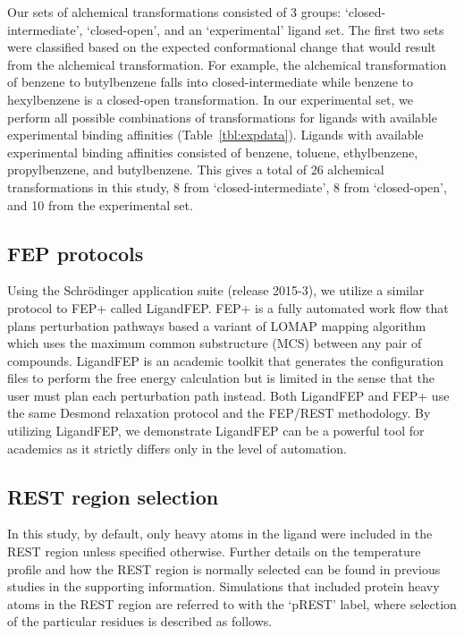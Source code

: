 \documentclass[journal=jctcce,manuscript=article]{achemso}
\begin{document}
Our sets of alchemical transformations consisted of 3 groups: `closed-intermediate', `closed-open', and an `experimental' ligand set.
The first two sets were classified based on the expected conformational change that would result from the alchemical transformation.
For example, the alchemical transformation of benzene to butylbenzene falls into closed-intermediate while benzene to hexylbenzene is a closed-open transformation.
In our experimental set, we perform all possible combinations of transformations for ligands with available experimental binding affinities (Table~\ref{tbl:expdata}).
Ligands with available experimental binding affinities consisted of benzene, toluene, ethylbenzene, propylbenzene, and butylbenzene.
This gives a total of 26 alchemical transformations in this study, 8 from `closed-intermediate', 8 from `closed-open', and 10 from the experimental set.
 
\subsection*{FEP protocols}
Using the Schr\"{o}dinger application suite (release 2015-3)\cite{Maestro-Desmond}, we utilize a similar protocol to FEP+\cite{FEPplus} called LigandFEP\cite{LigandFEP}.
FEP+ is a fully automated work flow that plans perturbation pathways based a variant of LOMAP\cite{LOMAP} mapping algorithm which uses the maximum common substructure (MCS) between any pair of compounds.
LigandFEP is an academic toolkit that generates the configuration files to perform the free energy calculation but is limited in the sense that the user must plan each perturbation path instead.
Both LigandFEP and FEP+ use the same Desmond relaxation protocol and the FEP/REST methodology\cite{REST,REST2,FEP/REST,FEP/RESTapp}. 
By utilizing LigandFEP, we demonstrate LigandFEP can be a powerful tool for academics as it strictly differs only in the level of automation.

\subsection*{REST region selection}
In this study, by default, only heavy atoms in the ligand were included in the REST region unless specified otherwise.
Further details on the temperature profile and how the REST region is normally selected can be found in previous studies\cite{FEP/REST,FEPplus} in the supporting information.
Simulations that included protein heavy atoms in the REST region are referred to with the `pREST' label, where selection of the particular residues is described as follows.
\end{document}
